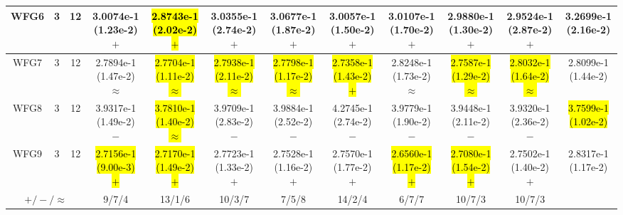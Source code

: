 \documentclass[journal]{IEEEtran}
\begin{document}
\begin{table*}[htbp]
\begin{tabular}{cccccccccccc}
\hline
\multirow{1}{*}{WFG6}&3&12&3.0074e-1 (1.23e-2) $+$&\hl{2.8743e-1 (2.02e-2) $+$}&3.0355e-1 (2.74e-2) $+$&3.0677e-1 (1.87e-2) $+$&3.0057e-1 (1.50e-2) $+$&3.0107e-1 (1.70e-2) $+$&2.9880e-1 (1.30e-2) $+$&2.9524e-1 (2.87e-2) $+$&3.2699e-1 (2.16e-2)\\
\hline
\multirow{1}{*}{WFG7}&3&12&2.7894e-1 (1.47e-2) $\approx$&\hl{2.7704e-1 (1.11e-2) $\approx$}&\hl{2.7938e-1 (2.11e-2) $\approx$}&\hl{2.7798e-1 (1.17e-2) $\approx$}&\hl{2.7358e-1 (1.43e-2) $+$}&2.8248e-1 (1.73e-2) $\approx$&\hl{2.7587e-1 (1.29e-2) $\approx$}&\hl{2.8032e-1 (1.64e-2) $\approx$}&2.8099e-1 (1.44e-2)\\
\hline
\multirow{1}{*}{WFG8}&3&12&3.9317e-1 (1.49e-2) $-$&\hl{3.7810e-1 (1.40e-2) $\approx$}&3.9709e-1 (2.83e-2) $-$&3.9884e-1 (2.52e-2) $-$&4.2745e-1 (2.74e-2) $-$&3.9779e-1 (1.90e-2) $-$&3.9448e-1 (2.11e-2) $-$&3.9320e-1 (2.36e-2) $-$&\hl{3.7599e-1 (1.02e-2)}\\
\hline
\multirow{1}{*}{WFG9}&3&12&\hl{2.7156e-1 (9.00e-3) $+$}&\hl{2.7170e-1 (1.49e-2) $+$}&2.7723e-1 (1.33e-2) $+$&2.7528e-1 (1.16e-2) $+$&2.7570e-1 (1.77e-2) $+$&\hl{2.6560e-1 (1.17e-2) $+$}&\hl{2.7080e-1 (1.54e-2) $+$}&2.7502e-1 (1.40e-2) $+$&2.8317e-1 (1.17e-2)\\
\hline
\multicolumn{3}{c}{$+/-/\approx$}&9/7/4&13/1/6&10/3/7&7/5/8&14/2/4&6/7/7&10/7/3&10/7/3&\\
\bottomrule
\end{tabular}
\label{No Label}
\end{table*}
\end{document}
